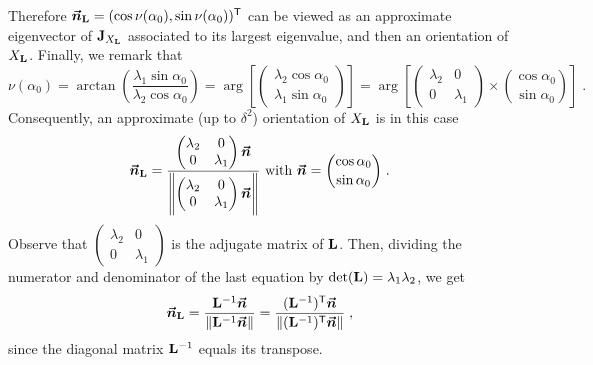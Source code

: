 \documentclass{elsarticle}
\begin{document}
Therefore $\bm{\vec n}_{\mathbf{L}}=(\cos \nu(\alpha_0),\sin \nu (\alpha_0))^{\mathsf{T}}$ can be viewed as an approximate eigenvector of $\mathbf{J}_{X_{\mathbf{L}}}$ associated to its largest eigenvalue, and then an orientation of $X_{\mathbf{L}}$.
Finally, we remark that
\[
\nu (\alpha_0)=\arctan \left( \frac{\lambda_1 \sin \alpha_0}{\lambda_2\cos \alpha_0}\right)=\arg\left[ \begin{pmatrix} \lambda_2 \cos \alpha_0\\ \lambda_1 \sin \alpha_0\end{pmatrix}\right]=\arg\left[ \begin{pmatrix}\lambda_2 & 0\\ 0 & \lambda_1\end{pmatrix}\times \binom{\cos \alpha_0}{\sin\alpha_0}\right]\;.
\]
Consequently, an approximate (up to $\delta^2$) orientation of $X_{\mathbf{L}}$ is in this case
\[
\bm{\vec n}_{\mathbf{L}}=\frac{\begin{pmatrix}\lambda_2 & 0\\ 0 & \lambda_1\end{pmatrix}\bm{\vec n}}{\left \lVert \begin{pmatrix}\lambda_2 & 0\\ 0 & \lambda_1\end{pmatrix}\bm{\vec n}\right \rVert}\mbox{ with }\bm{\vec n}=\binom{\cos \alpha_0}{\sin\alpha_0}\;.
\]
Observe that $\begin{pmatrix}\lambda_2 & 0\\ 0 & \lambda_1\end{pmatrix}$ is the adjugate matrix of $\mathbf{L}$. Then, dividing the numerator and denominator of the last equation by $\mathrm{det}(\mathbf{L})=\lambda_1 \lambda_2$, we get
\begin{equation}\label{e:diag}
\bm{\vec n}_{\mathbf{L}}=\frac{\mathbf{L}^{-1} \bm{\vec n}}{\lVert \mathbf{L}^{-1} \bm{\vec n}\rVert}=\frac{(\mathbf{L}^{-1})^{\mathsf{T}} \bm{\vec n}}{\lVert (\mathbf{L}^{-1})^{\mathsf{T}} \bm{\vec n}\rVert}\;,
\end{equation}
since the diagonal matrix $\mathbf{L}^{-1}$ equals its transpose.
\end{document}
